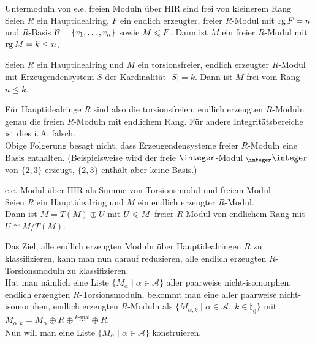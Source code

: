 \begin{Satz}{Untermoduln von e.e. freien Moduln über HIR
             sind frei von kleinerem Rang} \\
    Seien $R$ ein Hauptidealring, $F$ ein endlich erzeugter,
    freier $R$-Modul mit $\operatorname{rg} F = n$ und $R$-Basis
    $\mathcal{B} = \{v_1, \dotsc, v_n\}$ sowie $M \leqslant F$.
    Dann ist $M$ ein freier $R$-Modul mit $\operatorname{rg} M = k \le n$.
\end{Satz}

\begin{Kor}
    Seien $R$ ein Hauptidealring und $M$ ein torsionsfreier, endlich erzeugter
    $R$-Modul mit Erzeugendensystem $S$ der Kardinalität $|S| = k$.
    Dann ist $M$ frei vom Rang $n \le k$.
\end{Kor}

\begin{Bem}
    Für Hauptidealringe $R$ sind also die torsionsfreien, endlich erzeugten
    $R$-Moduln genau die freien $R$-Moduln mit endlichem Rang.
    Für andere Integritätsbereiche ist dies i.\,A. falsch. \\
    Obige Folgerung besagt nicht, dass Erzeugendensysteme freier $R$-Moduln
    eine Basis enthalten.
    (Beispielsweise wird der freie $\integer$-Modul ${}_\integer \integer$
    von $\{2, 3\}$ erzeugt, $\{2, 3\}$ enthält aber keine Basis.)
\end{Bem}

\begin{Satz}{e.e. Modul über HIR als Summe von Torsionsmodul und
             freiem Modul} \\
    Seien $R$ ein Hauptidealring und $M$ ein endlich erzeugter $R$-Modul. \\
    Dann ist $M = T(M) \oplus U$ mit $U \leqslant M$ freier $R$-Modul von
    endlichem Rang mit $U \cong M/T(M)$.
\end{Satz}

Das Ziel, alle endlich erzeugten Moduln über Hauptidealringen $R$ zu
klassifizieren, kann man nun darauf reduzieren, alle endlich erzeugten
$R$-Torsionsmoduln zu klassifizieren. \\
Hat man nämlich eine Liste $\{M_\alpha \;|\; \alpha \in \mathcal{A}\}$ aller
paarweise nicht-isomorphen, endlich erzeugten $R$-Torsionsmoduln, bekommt man
eine aller paarweise nicht-isomorphen, endlich erzeugten $R$-Moduln als
$\{M_{\alpha,k} \;|\; \alpha \in \mathcal{A},\; k \in \natural_0\}$ mit
$M_{\alpha,k} = M_\alpha \oplus
R \oplus \overset{k\text{-mal}}{\dotsb} \oplus R$. \\
Nun will man eine Liste $\{M_\alpha \;|\; \alpha \in \mathcal{A}\}$
konstruieren.

